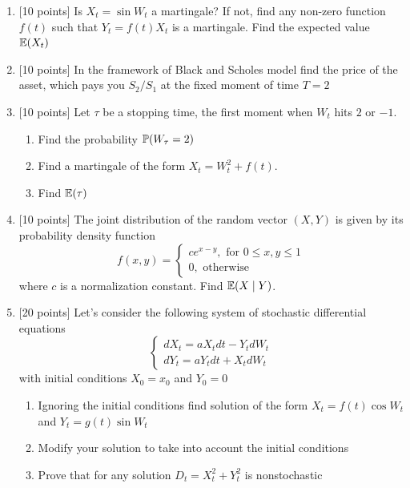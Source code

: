 \documentclass[12pt, a4paper]{article}
\begin{document}
\begin{enumerate}

\item $[$10 points] Is $X_t=\sin W_t$ a martingale? If not, find any non-zero function $f(t)$ such that $Y_t=f(t)X_t$ is a martingale. Find the expected value $\E(X_t)$

\item  $[$10 points] In the framework of Black and Scholes model find the price of the asset, which pays you $S_2/S_1$ at the fixed moment of time $T=2$

\item $[$10 points] Let $\tau$ be a stopping time, the first moment when $W_t$ hits $2$ or $-1$.
\begin{enumerate}
\item Find the probability $\P( W_{\tau} = 2)$
\item Find a martingale of the form $X_t=W_t^2+f(t)$.
\item Find $\E(\tau)$
\end{enumerate}

\item $[$10 points]  The joint distribution of the random vector $(X,Y)$ is given by its probability density function
\[
f(x,y)=
\left\{
  \begin{array}{l}
    c e^{x-y}, \text{ for } 0\leq x,y\leq 1 \\
    0, \text{ otherwise}
  \end{array}
\right.
\]
where $c$ is a normalization constant. Find $\E(X\mid Y)$.

\item $[$20 points] Let’s consider the following system of stochastic differential equations
\[
\left\{
  \begin{array}{l}
    dX_t=aX_t dt-Y_t dW_t \\
    dY_t=aY_t dt+X_t dW_t
  \end{array}
\right.
\]
with initial conditions $X_0=x_0$ and $Y_0=0$
\begin{enumerate}
\item Ignoring the initial conditions find solution of the form $X_t=f(t)\cos W_t$ and $Y_t=g(t)\sin W_t$
\item Modify your solution to take into account the initial conditions
\item Prove that for any solution $D_t=X_t^2+Y_t^2$ is nonstochastic
\end{enumerate}

\end{enumerate}
\end{document}
